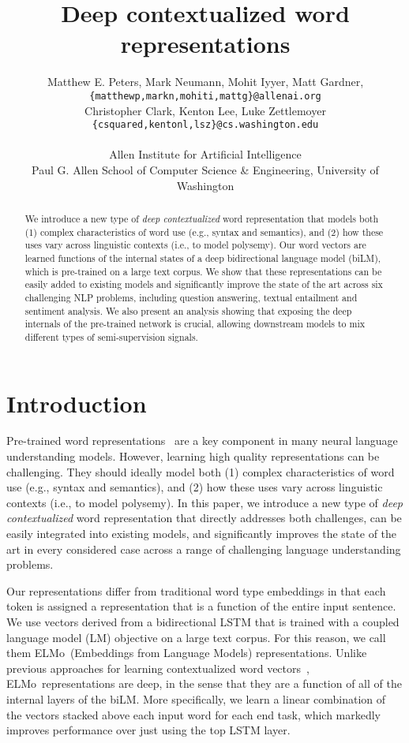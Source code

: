 \documentclass[11pt,a4paper]{article}
\title{Deep contextualized word representations}
\author{Matthew E. Peters, Mark Neumann, Mohit Iyyer, Matt Gardner, \\
\texttt{\{matthewp,markn,mohiti,mattg\}@allenai.org} \\
\AND
Christopher Clark, Kenton Lee, Luke Zettlemoyer \\
\texttt{\{csquared,kentonl,lsz\}@cs.washington.edu} \\
\\ Allen Institute for Artificial Intelligence \\
Paul G. Allen School of Computer Science \& Engineering, University of Washington
}
\newcommand{\ELMO}{ELMo}
\begin{document}
\maketitle

\begin{abstract}
We introduce a new type of {\em deep contextualized} word representation that models both (1) complex characteristics of word use (e.g., syntax and semantics), and (2) how these uses vary across linguistic
contexts (i.e., to model polysemy).
Our word vectors are learned functions of the internal states of a deep bidirectional language model (biLM), which is pre-trained on a large text corpus.
We show that these representations can be easily added to existing models and significantly improve the state of the art across six challenging NLP problems, including question answering, textual entailment and sentiment analysis.
We also present an analysis showing that exposing the deep internals of the pre-trained network is crucial, allowing downstream models to mix different types of semi-supervision signals.






\end{abstract}

\section{Introduction}
Pre-trained word representations~\citep{word2vec,Pennington2014GloveGV} are a key component in many neural language understanding models. 
However, learning high quality representations can be challenging.
They should ideally model both (1) complex characteristics of word use (e.g., syntax and semantics), and (2) how these uses vary across linguistic
contexts (i.e., to model polysemy).
In this paper, we introduce a new type of {\em deep contextualized} word representation that directly addresses both challenges, can be easily integrated into existing models, and significantly improves the state of the art in every considered case across a range of challenging language understanding problems.



Our representations differ from traditional word type embeddings in that each token is assigned a representation that is a function of the entire input sentence. We use vectors derived from a bidirectional LSTM that is trained with a coupled language model (LM) objective on a large text corpus. For this reason, we call them \ELMO\ (Embeddings from Language Models) representations. Unlike previous approaches for learning contextualized word vectors~\citep{Peters2017SemisupervisedST,McCann2017LearnedIT}, \ELMO\ representations are deep, in the sense that they are a function of all of the internal layers of the biLM. More specifically, we learn a linear combination of the vectors stacked above each input word for each end task, which markedly improves performance over just using the top LSTM layer.
\end{document}
